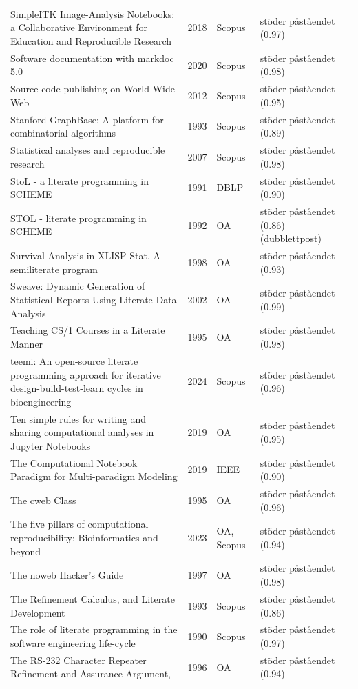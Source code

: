 \begin{longtable}{@{}%
  >{\raggedright\arraybackslash}p{}c%
  >{\raggedright\arraybackslash}p{}%
  >{\raggedright\arraybackslash}p{}@{}}
SimpleITK Image-Analysis Notebooks: a Collaborative Environment for Education and Reproducible Research & 2018 & Scopus & stöder påståendet (0.97) \\
Software documentation with markdoc 5.0 & 2020 & Scopus & stöder påståendet (0.98) \\
Source code publishing on World Wide Web & 2012 & Scopus & stöder påståendet (0.95) \\
Stanford GraphBase: A platform for combinatorial algorithms & 1993 & Scopus & stöder påståendet (0.89) \\
Statistical analyses and reproducible research & 2007 & Scopus & stöder påståendet (0.98) \\
StoL - a literate programming in SCHEME & 1991 & DBLP & stöder påståendet (0.90) \\
STOL - literate programming in SCHEME & 1992 & OA & stöder påståendet (0.86) (dubblettpost) \\
Survival Analysis in XLISP-Stat. A semiliterate program & 1998 & OA & stöder påståendet (0.93) \\
Sweave: Dynamic Generation of Statistical Reports Using Literate Data Analysis & 2002 & OA & stöder påståendet (0.99) \\
Teaching CS/1 Courses in a Literate Manner & 1995 & OA & stöder påståendet (0.98) \\
teemi: An open-source literate programming approach for iterative design-build-test-learn cycles in bioengineering & 2024 & Scopus & stöder påståendet (0.96) \\
Ten simple rules for writing and sharing computational analyses in Jupyter Notebooks & 2019 & OA & stöder påståendet (0.95) \\
The Computational Notebook Paradigm for Multi-paradigm Modeling & 2019 & IEEE & stöder påståendet (0.90) \\
The cweb Class & 1995 & OA & stöder påståendet (0.96) \\
The five pillars of computational reproducibility: Bioinformatics and beyond & 2023 & OA, Scopus & stöder påståendet (0.94) \\
The noweb Hacker's Guide & 1997 & OA & stöder påståendet (0.98) \\
The Refinement Calculus, and Literate Development & 1993 & Scopus & stöder påståendet (0.86) \\
The role of literate programming in the software engineering life-cycle & 1990 & Scopus & stöder påståendet (0.97) \\
The RS-232 Character Repeater Refinement and Assurance Argument, & 1996 & OA & stöder påståendet (0.94) \\

\end{longtable}
